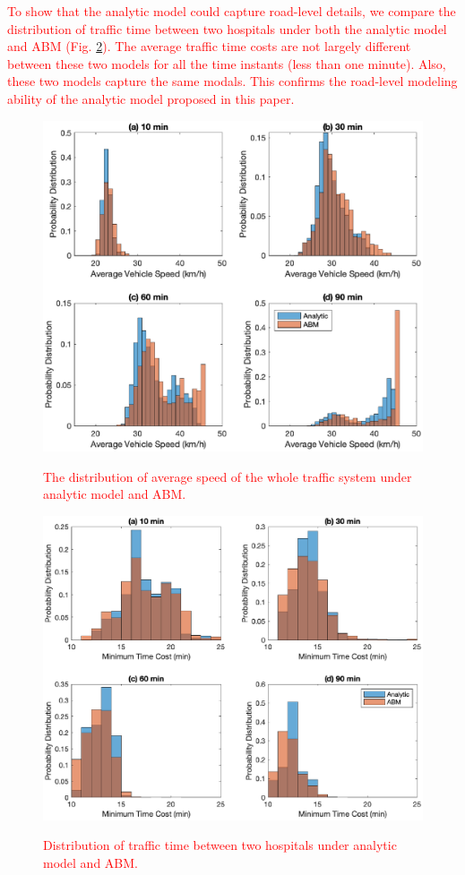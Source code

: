 \documentclass[review,11pt,nonatbib]{elsarticle}
\begin{document}
\textcolor{red}{To show that the analytic model could capture road-level details, we compare the distribution of traffic time between two hospitals under both the analytic model and ABM (Fig. \ref{fig11}). The average traffic time costs are not largely different between these two models for all the time instants (less than one minute). Also, these two models capture the same modals. This confirms the road-level modeling ability of the analytic model proposed in this paper.
}


\begin{figure}[!htp]\centering
\includegraphics[width=12cm]{global_hist_comparison.eps}\\
\caption{\textcolor{red}{The distribution of average speed of the whole traffic system under analytic model and ABM.}}\label{fig10}
\end{figure}

\begin{figure}[!htp]\centering
\includegraphics[width=12cm]{hospital_path_comparison.eps}\\
\caption{\textcolor{red}{Distribution of traffic time between two hospitals under analytic model and ABM.}}\label{fig11}
\end{figure}
\end{document}

